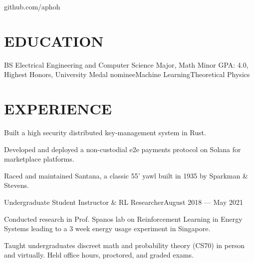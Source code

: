 \documentclass[10pt]{article}
\begin{document}
				 {github.com/aphoh}      

\section*{EDUCATION}

    {BS {\textendash} Electrical Engineering and Computer Science Major, Math Minor}
{GPA: 4.0, Highest Honors, University Medal nominee}{Machine Learning}{Theoretical Physics}


\section*{EXPERIENCE}

          \begin{accomplishments}
            \item Built a high security distributed key-management system in Rust.
            \item Developed and deployed a non-custodial e2e payments protocol on Solana for marketplace platforms.
          \end{accomplishments}

            \begin{accomplishments}
              \item Raced and maintained Santana, a classic 55' yawl built in 1935 by Sparkman \& Stevens.
            \end{accomplishments}

            {Undergraduate Student Instructor \& RL Researcher}{August 2018 --- May 2021}
              \begin{accomplishments}
                \item Conducted research in Prof. Spanos lab on Reinforcement Learning in Energy Systems leading to a 3 week energy usage experiment in Singapore.
                \item Taught undergraduates discreet math and probability theory (CS70) in person and virtually. Held office hours, proctored, and graded exams.
            \end{accomplishments}
\end{document}
